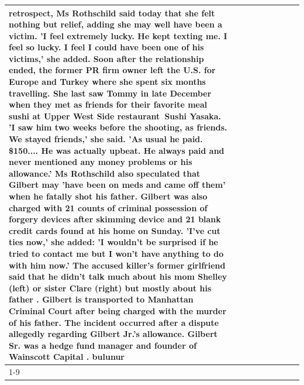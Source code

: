 \begin{table}[H]
\begin{tabular}{lllrlllll}
retrospect, Ms Rothschild said today that she felt nothing but relief, adding she may well have been a victim. 'I feel extremely lucky. He kept texting me. I feel so lucky. I feel I could have been one of his victims,' she added. Soon after the relationship ended, the former PR firm owner left the U.S. for Europe and Turkey where she spent six months  travelling. She last saw Tommy in late December when they met as friends for their favorite meal sushi at Upper West Side restaurant Sushi Yasaka. 'I saw him two weeks before the shooting, as friends. We stayed friends,' she said. 'As usual he paid. \$150.... He was actually upbeat. He always paid and never mentioned any money problems or his allowance.' Ms Rothschild also speculated that Gilbert may 'have been on meds and came off them' when he fatally shot his father. Gilbert was also charged with 21 counts of criminal possession of forgery devices after skimming device and 21 blank credit cards found at his home on Sunday. 'I've cut ties now,' she added: 'I wouldn’t be surprised if he tried to contact me but I won’t have anything to do with him now.' The accused killer's former girlfriend said that he didn't talk much about his mom Shelley (left) or sister Clare (right) but mostly about his father . Gilbert is transported to Manhattan Criminal Court  after being charged with the murder of his father. The incident occurred after a dispute allegedly regarding Gilbert Jr.'s allowance. Gilbert Sr. was a hedge fund manager and founder of Wainscott Capital . bulunur \\
\cline{1-9} \cline{2-9}

\end{tabular}
\end{table}
